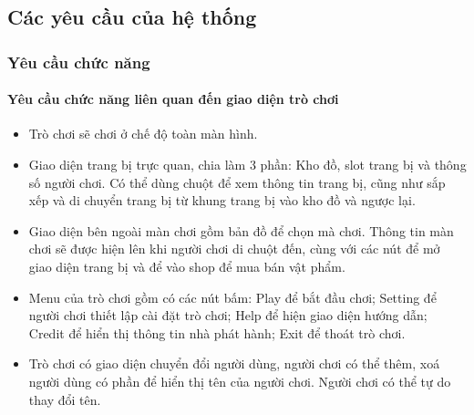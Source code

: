 \subsection{Các yêu cầu của hệ thống}
\subsubsection{Yêu cầu chức năng}
\paragraph {Yêu cầu chức năng liên quan đến giao diện trò chơi}
\begin{itemize}
	\item Trò chơi sẽ chơi ở chế độ toàn màn hình.
	\item Giao diện trang bị trực quan, chia làm 3 phần: Kho đồ, slot trang bị và thông số người chơi. Có thể dùng chuột để xem thông tin trang bị, cũng như sắp xếp và di chuyển trang bị từ khung trang bị vào kho đồ và ngược lại.
	\item Giao diện bên ngoài màn chơi gồm bản đồ để chọn mà chơi. Thông tin màn chơi sẽ được hiện lên khi người chơi di chuột đến, cùng với các nút để mở giao diện trang bị và để vào shop để mua bán vật phẩm.
	\item Menu của trò chơi gồm có các nút bấm: Play để bắt đầu chơi; Setting để người chơi thiết lập cài đặt trò chơi; Help để hiện giao diện hướng dẫn; Credit để hiển thị thông tin nhà phát hành; Exit để thoát trò chơi.
	\item Trò chơi có giao diện chuyển đổi người dùng, người chơi có thể thêm, xoá người dùng có phần để hiển thị tên của người chơi. Người chơi có thể tự do thay đổi tên.
\end{itemize}


